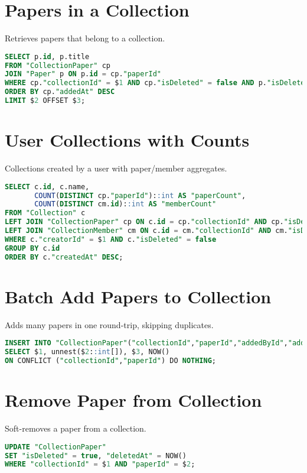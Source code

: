 \section{Papers in a Collection}
Retrieves papers that belong to a collection.
\begin{lstlisting}[language=SQL]
SELECT p.id, p.title
FROM "CollectionPaper" cp
JOIN "Paper" p ON p.id = cp."paperId"
WHERE cp."collectionId" = $1 AND cp."isDeleted" = false AND p."isDeleted" = false
ORDER BY cp."addedAt" DESC
LIMIT $2 OFFSET $3;
\end{lstlisting}

\section{User Collections with Counts}
Collections created by a user with paper/member aggregates.
\begin{lstlisting}[language=SQL]
SELECT c.id, c.name,
       COUNT(DISTINCT cp."paperId")::int AS "paperCount",
       COUNT(DISTINCT cm.id)::int AS "memberCount"
FROM "Collection" c
LEFT JOIN "CollectionPaper" cp ON c.id = cp."collectionId" AND cp."isDeleted" = false
LEFT JOIN "CollectionMember" cm ON c.id = cm."collectionId" AND cm."isDeleted" = false
WHERE c."creatorId" = $1 AND c."isDeleted" = false
GROUP BY c.id
ORDER BY c."createdAt" DESC;
\end{lstlisting}

\section{Batch Add Papers to Collection}
Adds many papers in one round-trip, skipping duplicates.
\begin{lstlisting}[language=SQL]
INSERT INTO "CollectionPaper"("collectionId","paperId","addedById","addedAt")
SELECT $1, unnest($2::int[]), $3, NOW()
ON CONFLICT ("collectionId","paperId") DO NOTHING;
\end{lstlisting}

\section{Remove Paper from Collection}
Soft-removes a paper from a collection.
\begin{lstlisting}[language=SQL]
UPDATE "CollectionPaper"
SET "isDeleted" = true, "deletedAt" = NOW()
WHERE "collectionId" = $1 AND "paperId" = $2;
\end{lstlisting}

